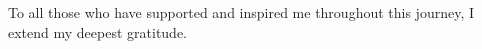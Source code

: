 ﻿%

\begin{acknowledgements}
  To all those who have supported and inspired me throughout this journey, I extend my deepest gratitude.
\end{acknowledgements}
